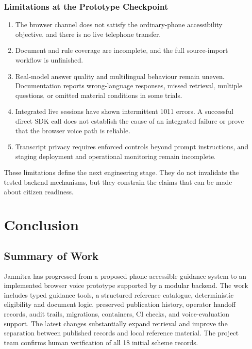 \documentclass[11pt,a4paper,oneside]{report}
\begin{document}
\subsection{Limitations at the Prototype Checkpoint}
\begin{enumerate}
  \item The browser channel does not satisfy the ordinary-phone accessibility
    objective, and there is no live telephone transfer.
  \item Document and rule coverage are incomplete, and the full source-import
    workflow is unfinished.
  \item Real-model answer quality and multilingual behaviour remain uneven.
    Documentation reports wrong-language responses, missed retrieval, multiple
    questions, or omitted material conditions in some trials.
  \item Integrated live sessions have shown intermittent 1011 errors. A successful
    direct SDK call does not establish the cause of an integrated failure or prove
    that the browser voice path is reliable.
  \item Transcript privacy requires enforced controls beyond prompt instructions,
    and staging deployment and operational monitoring remain incomplete.
\end{enumerate}

These limitations define the next engineering stage. They do not invalidate the
tested backend mechanisms, but they constrain the claims that can be made about
citizen readiness.

\chapter{Conclusion}

\section{Summary of Work}
Janmitra has progressed from a proposed phone-accessible guidance system to an
implemented browser voice prototype supported by a modular backend. The work
includes typed guidance tools, a structured reference catalogue, deterministic
eligibility and document logic, preserved publication history, operator handoff
records, audit trails, migrations, containers, CI checks, and voice-evaluation
support. The latest changes substantially expand retrieval and improve the
separation between published records and local reference material. The project
team confirms human verification of all 18 initial scheme records.
\end{document}

